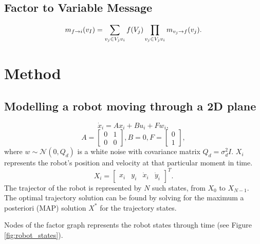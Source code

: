 \documentclass[twocolumn]{article}
\begin{document}
\subsection{Factor to Variable Message}
\begin{equation}
    m_{f \rightarrow i}(v_I) = \sum_{v_j \in V_j \\ v_i}{f(V_j)}\prod_{v_j \in V_j \\ v_i}{m_{v_j \rightarrow f}(v_j)}.
\end{equation}

\section{Method}

\subsection{Modelling a robot moving through a 2D plane}

\begin{equation}
    \dot{x}_i = Ax_i + Bu_i + Fw_i,
\end{equation}
\begin{equation}
    A  = \begin{bmatrix}
        0 & 1\\
        0 & 0
    \end{bmatrix},
    B = 0,
    F = \begin{bmatrix}
        0\\1
    \end{bmatrix},
\end{equation}
where $w \sim \mathcal{N}(0, Q_d)$ is a white noise with covariance matrix $Q_d = \sigma^2_dI$.
$X_i$ represents the robot's position and velocity at that particular moment in time.
\begin{equation}
    X_i = \begin{bmatrix}
        x_i & y_i & \dot{x}_i & \dot{y}_i
    \end{bmatrix}^T.
\end{equation}
The trajector of the robot is represented by $N$ such states, from $X_0$ to $X_{N-1}$.
The optimal trajectory solution can be found by solving for the maximum a posteriori (MAP) solution $X^*$ for the trajectory states.

Nodes of the factor graph represents the robot states through time (see Figure \ref{fig:robot_states}).
\end{document}
